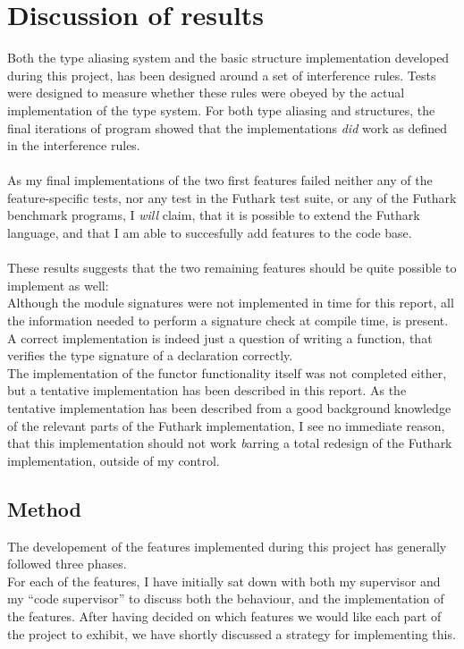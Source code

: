 \section{Discussion of results}
\label{sec:final_section}

Both the type aliasing system and the basic structure implementation developed
during this project, has been designed around a set of interference rules.
Tests were designed to measure whether these rules were obeyed by the actual
implementation of the type system.
For both type aliasing and structures, the final iterations of program showed
that the implementations \textit{did} work as defined in the interference rules.
\\
\\
As my final implementations of the two first features failed neither any of the
feature-specific tests, nor any test in the Futhark test suite, or any of the
Futhark benchmark programs\cite{Futhark_benchmarks}, I \textit{will} claim, that
it is possible to extend the Futhark language, and that I am able to succesfully
add features to the code base.
\\
\\
These results suggests that the two remaining features should be quite possible
to implement as well:\\
Although the module signatures were not implemented in time for this report, all the information
needed to perform a signature check at compile time, is present. A correct
implementation is indeed just a question of writing a function, that verifies
the type signature of a declaration correctly.
\\
The implementation of the functor functionality itself was not completed either,
but a tentative implementation has been described in this report.
As the tentative implementation has been described from a good background knowledge
of the relevant parts of the Futhark implementation, I see no immediate reason,
that this implementation should not work \emph barring a total redesign of
the Futhark implementation, outside of my control.
\\

\subsection{Method}
\label{subsec:method}
The developement of the features implemented during this project has generally
followed three phases.\\
For each of the features, I have initially sat down with both my supervisor and
my ``code supervisor'' to discuss both the behaviour, and the implementation of
the features. After having decided on which features we would like each part of
the project to exhibit, we have shortly discussed a strategy for implementing
this.

